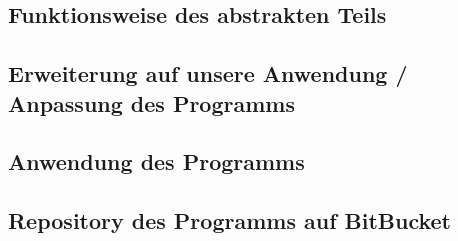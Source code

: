 \documentclass[twoside,a4paper,draft]{article}
\begin{document}
\begin{multicols}{2}
\subsection{Funktionsweise des abstrakten Teils}

\subsection{Erweiterung auf unsere Anwendung / Anpassung des Programms}

\subsection{Anwendung des Programms}

\subsection{Repository des Programms auf BitBucket}

\end{multicols}
\end{document}
